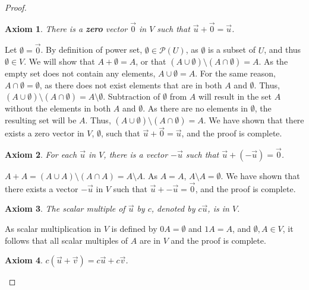 \documentclass[11pt]{scrartcl}
\theoremstyle{dotlessP}
\newtheorem{axiom}{Axiom}
\theoremstyle{dotlessN}
\newcommand{\unite}{\cup}
\newcommand{\inter}{\cap}
\newcommand{\powset}{\mathcal{P}}
\begin{document}
\begin{proof}
		\begin{axiom}
			There is a \textbf{zero} vector $\vec{0}$ in $V$ such that $\vec{u} + \vec{0} = \vec{u}$.
			\label{axiom:4}
		\end{axiom}
		\begin{subproof}
			[Subproof]
			Let $\emptyset = \vec{0}$. By definition of power set, $\emptyset \in \powset(U)$, as $\emptyset$ is a subset of $U$, and thus $\emptyset \in V$. We will show that $A + \emptyset = A$, or that  $(A \unite \emptyset) \setminus (A \inter \emptyset) = A$. As the empty set does not contain any elements, $A \unite \emptyset = A$. For the same reason, $A \inter \emptyset = \emptyset$, as there does not exist elements that are in both  $A$ and $\emptyset$. Thus,  $(A \unite \emptyset) \setminus (A \inter \emptyset) = A \setminus \emptyset$. Subtraction of  $\emptyset$ from $A$ will result in the set $A$ without the elements in both $A$ and $\emptyset$. As there are no elements in $\emptyset$, the resulting set will be $A$. Thus, $(A \unite \emptyset) \setminus (A \inter \emptyset) = A$. We have shown that there exists a zero vector in $V$, $\emptyset$, such that $\vec{u} + \vec{0} = \vec{u}$, and the proof is complete.
		\end{subproof}
		\begin{axiom}
			For each $\vec{u}$ in $V$, there is a vector $-\vec{u}$ such that $\vec{u} + (-\vec{u}) = \vec{0}$.
			\label{axiom:5}
		\end{axiom}
		\begin{subproof}
			$A + A = (A \unite A) \setminus (A \inter A) = A \setminus A$. As $A = A$, $A \setminus A = \emptyset$. We have shown that there exists a vector  $-\vec{u}$ in $V$ such that $\vec{u} + -\vec{u} = \vec{0}$, and the proof is complete.
		\end{subproof}
		\begin{axiom}
			The scalar multiple of $\vec{u}$ by $c$, denoted by $c\vec{u}$, is in $V$.
		\end{axiom}
		\begin{subproof}
			[Subproof]
			As scalar multiplication in $V$ is defined by $0A = \emptyset$ and $1A = A$, and $\emptyset, A \in V$, it follows that all scalar multiples of $A$ are in $V$ and the proof is complete.
		\end{subproof}
		\begin{axiom}
			$c(\vec{u} + \vec{v}) = c\vec{u} + c\vec{v}$.
			\label{axiom:7}
		\end{axiom}
		\begin{subproof}

\end{subproof}
\end{proof}
\end{document}
